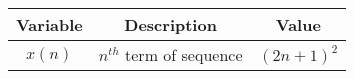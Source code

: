 
      \begin{tabular}{|c|c|c|} 
      \hline
\textbf{Variable}& \textbf{Description}& \textbf{Value}\\\hline
         $x(n)$& $n^{th}$ term of sequence& $(2n+1)^2$\\\hline
          
    \end{tabular}

